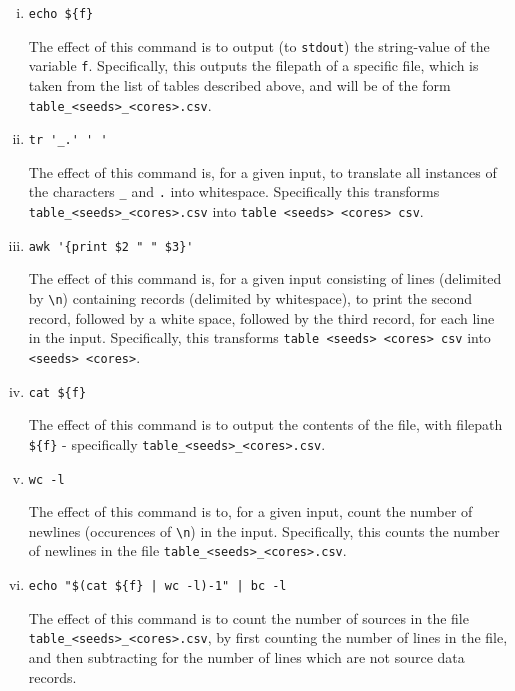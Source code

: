 \documentclass{article}
\begin{document}
\begin{enumerate}[i.]
\item
  \lstinline!echo ${f}!

  The effect of this command is to output (to \lstinline{stdout}) the
  string-value of the variable \lstinline{f}.
  Specifically, this outputs the filepath of a specific file, which is taken
  from the list of tables described above, and will be of the form
  \lstinline!table_<seeds>_<cores>.csv!.

\item
  \lstinline!tr '_.' ' '!

  The effect of this command is, for a given input, to translate all instances
  of the characters \lstinline!_! and \lstinline!.! into whitespace.
  Specifically this transforms \lstinline!table_<seeds>_<cores>.csv! into
  \lstinline!table <seeds> <cores> csv!.

\item
  \lstinline!awk '{print $2 " " $3}'!

  The effect of this command is, for a given input consisting of lines
  (delimited by \lstinline!\n!) containing records (delimited by whitespace), to
  print the second record, followed by a white space, followed by the third
  record, for each line in the input.
  Specifically, this transforms \lstinline!table <seeds> <cores> csv! into
  \lstinline!<seeds> <cores>!.

\item
  \lstinline!cat ${f}!

  The effect of this command is to output the contents of the file, with
  filepath \lstinline!${f}! - specifically
  \lstinline!table_<seeds>_<cores>.csv!.

\item
  \lstinline!wc -l!

  The effect of this command is to, for a given input, count the number of
  newlines (occurences of \lstinline!\n!) in the input.
  Specifically, this counts the number of newlines in the file
  \lstinline!table_<seeds>_<cores>.csv!.

\item
  \lstinline!echo "$(cat ${f} | wc -l)-1" | bc -l!

  The effect of this command is to count the number of sources in the file
  \lstinline!table_<seeds>_<cores>.csv!, by first counting the number of lines
  in the file, and then subtracting for the number of lines which are not source
  data records.


\end{enumerate}
\end{document}

